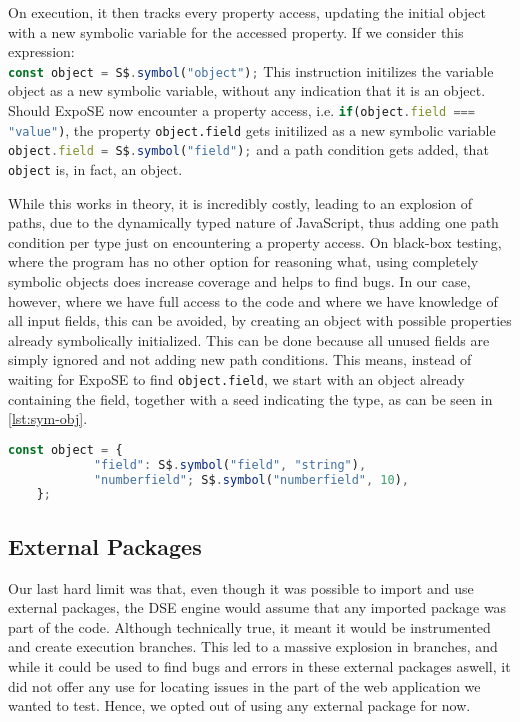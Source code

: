 On execution, it then tracks every property access, updating the initial object with a new symbolic variable for the accessed property. 
If we consider this expression:\\
\lstinline[language=JavaScript, gobble=4, escapechar=@]{const object = S$.symbol("object");}
This instruction initilizes the variable object as a new symbolic variable, without any indication that it is an object. 
Should ExpoSE now encounter a property access, i.e.
\lstinline[language=JavaScript, gobble=4, escapechar=@]{if(object.field === "value")},
the property \lstinline{object.field} gets initilized as a new symbolic variable
\lstinline[language=JavaScript, gobble=4, escapechar=@]{object.field = S$.symbol("field");} 
and a path condition gets added, that \lstinline{object} is, in fact, an object.\cite{loring_systematic_2021}

While this works in theory, it is incredibly costly, leading to an explosion of paths, due to the dynamically typed nature of JavaScript, thus adding one path condition per type just on encountering a property access. On black-box testing, where the program has no other option for reasoning what, using completely symbolic objects does increase coverage and helps to find bugs.
In our case, however, where we have full access to the code and where we have knowledge of all input fields, this can be avoided, by creating an object with possible properties already symbolically initialized. This can be done because all unused fields are simply ignored and not adding new path conditions. 
This means, instead of waiting for ExpoSE to find \lstinline{object.field}, we start with an object already containing the field, together with a seed indicating the type, as can be seen in \autoref{lst:sym-obj}.
\begin{minipage}{\linewidth}
    \begin{lstlisting}[language=JavaScript, gobble=4, escapechar=@]
        const object = {
            "field": S$.symbol("field", "string"),
            "numberfield"; S$.symbol("numberfield", 10),
    };
\end{lstlisting}
\label{lst:sym-obj}
\end{minipage}





\subsection{External Packages}
\label{sec:externalpack}
Our last hard limit was that, even though it was possible to import and use external packages, the DSE engine would assume that any imported package was part of the code. Although technically true, it meant it would be instrumented and create execution branches. This led to a massive explosion in branches, and while it could be used to find bugs and errors in these external packages aswell, it did not offer any use for locating issues in the part of the web application we wanted to test. 
Hence, we opted out of using any external package for now.

